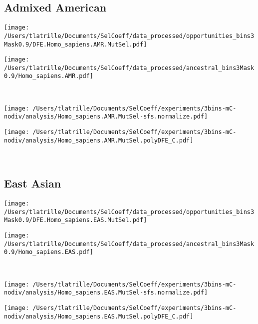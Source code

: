 \documentclass{article}
\begin{document}
    \subsection{Admixed American}

    \begin{minipage}{0.49\linewidth}
        \texttt{[image: /Users/tlatrille/Documents/SelCoeff/data\_processed/opportunities\_bins3Mask0.9/DFE.Homo\_sapiens.AMR.MutSel.pdf]}
    \end{minipage}
    \begin{minipage}{0.49\linewidth}
        \texttt{[image: /Users/tlatrille/Documents/SelCoeff/data\_processed/ancestral\_bins3Mask0.9/Homo\_sapiens.AMR.pdf]}
    \end{minipage}
    \\
    \begin{minipage}{0.49\linewidth}
        \texttt{[image: /Users/tlatrille/Documents/SelCoeff/experiments/3bins-mC-nodiv/analysis/Homo\_sapiens.AMR.MutSel-sfs.normalize.pdf]}
    \end{minipage}
    \begin{minipage}{0.49\linewidth}
        \texttt{[image: /Users/tlatrille/Documents/SelCoeff/experiments/3bins-mC-nodiv/analysis/Homo\_sapiens.AMR.MutSel.polyDFE\_C.pdf]}
    \end{minipage}
    \\
    \subsection{East Asian}

    \begin{minipage}{0.49\linewidth}
        \texttt{[image: /Users/tlatrille/Documents/SelCoeff/data\_processed/opportunities\_bins3Mask0.9/DFE.Homo\_sapiens.EAS.MutSel.pdf]}
    \end{minipage}
    \begin{minipage}{0.49\linewidth}
        \texttt{[image: /Users/tlatrille/Documents/SelCoeff/data\_processed/ancestral\_bins3Mask0.9/Homo\_sapiens.EAS.pdf]}
    \end{minipage}
    \\
    \begin{minipage}{0.49\linewidth}
        \texttt{[image: /Users/tlatrille/Documents/SelCoeff/experiments/3bins-mC-nodiv/analysis/Homo\_sapiens.EAS.MutSel-sfs.normalize.pdf]}
    \end{minipage}
    \begin{minipage}{0.49\linewidth}
        \texttt{[image: /Users/tlatrille/Documents/SelCoeff/experiments/3bins-mC-nodiv/analysis/Homo\_sapiens.EAS.MutSel.polyDFE\_C.pdf]}
    \end{minipage}
    \\
\end{document}
